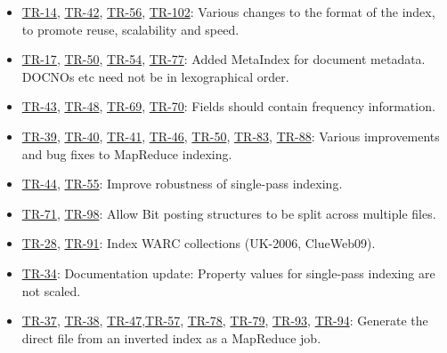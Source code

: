 \begin{itemize}
\tightlist
\item
  \href{http://terrier.org/issues/browse/TR-14}{TR-14},
  \href{http://terrier.org/issues/browse/TR-42}{TR-42},
  \href{http://terrier.org/issues/browse/TR-56}{TR-56},
  \href{http://terrier.org/issues/browse/TR-102}{TR-102}: Various
  changes to the format of the index, to promote reuse, scalability and
  speed.
\item
  \href{http://terrier.org/issues/browse/TR-17}{TR-17},
  \href{http://terrier.org/issues/browse/TR-50}{TR-50},
  \href{http://terrier.org/issues/browse/TR-54}{TR-54},
  \href{http://terrier.org/issues/browse/TR-77}{TR-77}: Added MetaIndex
  for document metadata. DOCNOs etc need not be in lexographical order.
\item
  \href{http://terrier.org/issues/browse/TR-}{TR-43},
  \href{http://terrier.org/issues/browse/TR-48}{TR-48},
  \href{http://terrier.org/issues/browse/TR-69}{TR-69},
  \href{http://terrier.org/issues/browse/TR-70}{TR-70}: Fields should
  contain frequency information.
\item
  \href{http://terrier.org/issues/browse/TR-39}{TR-39},
  \href{http://terrier.org/issues/browse/TR-40}{TR-40},
  \href{http://terrier.org/issues/browse/TR-41}{TR-41},
  \href{http://terrier.org/issues/browse/TR-46}{TR-46},
  \href{http://terrier.org/issues/browse/TR-50}{TR-50},
  \href{http://terrier.org/issues/browse/TR-83}{TR-83},
  \href{http://terrier.org/issues/browse/TR-88}{TR-88}: Various
  improvements and bug fixes to MapReduce indexing.
\item
  \href{http://terrier.org/issues/browse/TR-44}{TR-44},
  \href{http://terrier.org/issues/browse/TR-55}{TR-55}: Improve
  robustness of single-pass indexing.
\item
  \href{http://terrier.org/issues/browse/TR-71}{TR-71},
  \href{http://terrier.org/issues/browse/TR-98}{TR-98}: Allow Bit
  posting structures to be split across multiple files.
\item
  \href{http://terrier.org/issues/browse/TR-28}{TR-28},
  \href{http://terrier.org/issues/browse/TR-91}{TR-91}: Index WARC
  collections (UK-2006, ClueWeb09).
\item
  \href{http://terrier.org/issues/browse/TR-34}{TR-34}: Documentation
  update: Property values for single-pass indexing are not scaled.
\item
  \href{http://terrier.org/issues/browse/TR-37}{TR-37},
  \href{http://terrier.org/issues/browse/TR-38}{TR-38},
  \href{http://terrier.org/issues/browse/TR-47}{TR-47},\href{http://terrier.org/issues/browse/TR-57}{TR-57},
  \href{http://terrier.org/issues/browse/TR-78}{TR-78},
  \href{http://terrier.org/issues/browse/TR-79}{TR-79},
  \href{http://terrier.org/issues/browse/TR-93}{TR-93},
  \href{http://terrier.org/issues/browse/TR-94}{TR-94}: Generate the
  direct file from an inverted index as a MapReduce job.
\end{itemize}

